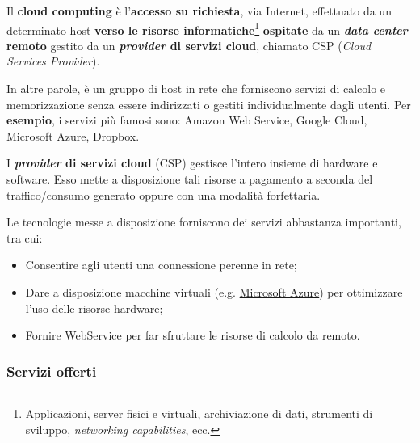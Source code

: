 \documentclass[a4paper]{article}
\begin{document}
	Il \textcolor{Red3}{\textbf{cloud computing}} è l'\textbf{accesso su richiesta}, via Internet, effettuato da un determinato host \textbf{verso le risorse informatiche}\footnote{Applicazioni, server fisici e virtuali, archiviazione di dati, strumenti di sviluppo, \emph{networking capabilities}, ecc.} \textbf{ospitate} da un \textbf{\emph{data center} remoto} gestito da un \textbf{\emph{provider} di servizi cloud}, chiamato CSP (\emph{Cloud Services Provider}).\newline
	
	\noindent
	In altre parole, è un gruppo di host in rete che forniscono servizi di calcolo e memorizzazione senza essere indirizzati o gestiti individualmente dagli utenti. Per \textcolor{Green4}{\textbf{esempio}}, i servizi più famosi sono: Amazon Web Service, Google Cloud, Microsoft Azure, Dropbox.\newline
	
	\noindent
	I \textbf{\emph{provider} di servizi cloud} (CSP) gestisce l'intero insieme di hardware e software. Esso mette a disposizione tali risorse a pagamento a seconda del traffico/consumo generato oppure con una modalità forfettaria.\newline
	
	\noindent
	Le tecnologie messe a disposizione forniscono dei servizi abbastanza importanti, tra cui:
	\begin{itemize}
		\item Consentire agli utenti una connessione perenne in rete;
		
		\item Dare a disposizione macchine virtuali (e.g. \href{https://azure.microsoft.com/it-it/resources/cloud-computing-dictionary/what-is-azure/}{Microsoft Azure}) per ottimizzare l'uso delle risorse hardware;
		
		\item Fornire WebService per far sfruttare le risorse di calcolo da remoto.
	\end{itemize}\newpage
	
	\subsubsection{Servizi offerti}
	
\end{document}
